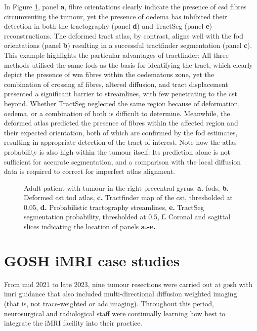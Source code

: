 In Figure \ref{fig:oedema}, panel \textbf{a}, fibre orientations clearly indicate the presence of \gls{csd} fibres circumventing the tumour, yet the presence of oedema has inhibited their detection in both the tractography (panel \textbf{d}) and TractSeg (panel \textbf{e}) reconstructions.
The deformed tract atlas, by contrast, aligns well with the \gls{fod} orientations (panel \textbf{b}) resulting in a successful tractfinder segmentation  (panel \textbf{c}).
This example highlights the particular advantages of tractfinder:
All three methods utilised the same \glspl{fod} as the basis for identifying the tract, which clearly depict the presence of \gls{wm} fibres within the oedematous zone, yet the combination of crossing \gls{af} fibres, altered diffusion, and tract displacement presented a significant barrier to streamlines, with few penetrating to the \gls{cst} beyond.
Whether TractSeg neglected the same region because of deformation, oedema, or a combination of both is difficult to determine.
Meanwhile, the deformed atlas predicted the presence of fibres within the affected region and their expected orientation, both of which are confirmed by the \gls{fod} estimates, resulting in appropriate detection of the tract of interest.
Note how the atlas probability is also high within the tumour itself:
Its prediction alone is not sufficient for accurate segmentation, and a comparison with the local diffusion data is required to correct for imperfect atlas alignment.

\begin{figure}
  
  \caption{Adult patient with tumour in the right precentral gyrus. \textbf{a.} \glspl{fod}, \textbf{b.} Deformed \gls{cst} \gls{tod} atlas, \textbf{c.} Tractfinder map of the \gls{cst}, thresholded at 0.05, \textbf{d.} Probabilistic tractography streamlines, \textbf{e.} TractSeg segmentation probability, thresholded at 0.5, \textbf{f.} Coronal and sagittal slices indicating the location of panels \textbf{a.-e.}}
  \label{fig:oedema}
\end{figure}

\clearpage
\section{GOSH iMRI case studies}\label{sec:case}

From mid 2021 to late 2023, nine tumour resections were carried out at \gls{gosh} with \gls{imri} guidance that also included multi-directional diffusion weighted imaging (that is, not trace-weighted or \gls{adc} imaging).
Throughout this period, neurosurgical and radiological staff were continually learning how best to integrate the iMRI facility into their practice.

